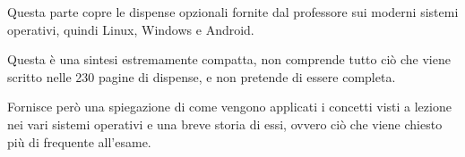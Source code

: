 Questa parte copre le dispense opzionali fornite dal professore sui moderni sistemi operativi, quindi Linux, Windows e Android.

\spacer
Questa è una sintesi estremamente compatta, non comprende tutto ciò che viene scritto nelle 230 pagine di dispense, e non pretende di essere completa.

Fornisce però una spiegazione di come vengono applicati i concetti visti a lezione nei vari sistemi operativi e una breve storia di essi, ovvero ciò che viene chiesto più di frequente all'esame.



